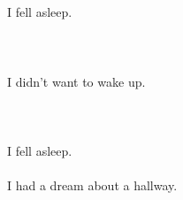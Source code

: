 \documentclass{article}
\begin{document}
    \section{}
    I fell asleep.\\\\ 
    \newpage
    
    \section{}
    I didn't want to wake up.\\\\ 
    \newpage
    
    \section{}
    I fell asleep.\\\\I had a dream about a hallway.\\\\ 
    \newpage
    
    
\end{document}
